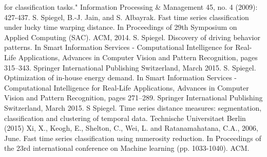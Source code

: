 \begin{thebibliography}{1}
        for classification tasks." Information Processing \& Management 45, no. 4 (2009): 427-437.
	 S. Spiegel, B.-J. Jain, and S. Albayrak. Fast time series classification under lucky time warping distance. 
		In Proceedings of 29th Symposium on Applied Computing (SAC). ACM, 2014.
	 S. Spiegel. Discovery of driving behavior patterns. 
		In Smart Information Services - Computational Intelligence for Real-Life Applications, Advances in Computer Vision and Pattern Recognition, pages 315–343. Springer International Publishing Switzerland, March 2015.
	 S. Spiegel. Optimization of in-house energy demand. 
		In Smart Information Services - Computational Intelligence for Real-Life Applications, Advances in Computer Vision and Pattern Recognition, pages 271–289. Springer International Publishing Switzerland, March 2015.
	 S Spiegel. Time series distance measures: segmentation, classification and clustering of temporal data. 
		Technische Universitaet Berlin (2015)
	 Xi, X., Keogh, E., Shelton, C., Wei, L. and Ratanamahatana, C.A., 2006, June. Fast time series
        classification using numerosity reduction. In Proceedings of the 23rd international conference on Machine
        learning (pp. 1033-1040). ACM.           
\end{thebibliography}
